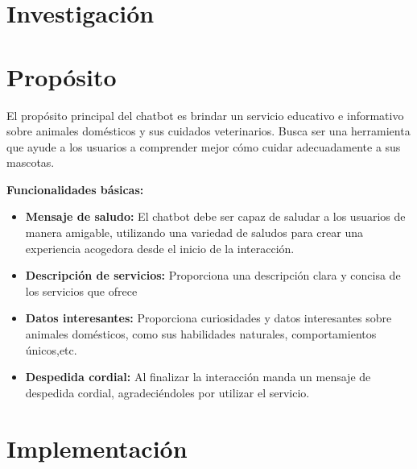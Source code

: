 \documentclass[a4paper,12pt]{article}
\begin{document}
\section*{Investigación}

\section*{Propósito}
El propósito principal del chatbot es brindar un servicio educativo e informativo sobre animales domésticos y sus cuidados veterinarios. Busca ser una herramienta que ayude a los usuarios a comprender mejor cómo cuidar adecuadamente a sus mascotas.

\textbf{Funcionalidades básicas:}
\begin{itemize}
    \item \textbf{Mensaje de saludo:} El chatbot debe ser capaz de saludar a los usuarios de manera amigable, utilizando una variedad de saludos para crear una experiencia acogedora desde el inicio de la interacción.
    
    \item \textbf{Descripción de servicios:} Proporciona una descripción clara y concisa de los servicios que ofrece 

    \item \textbf{Datos interesantes:} Proporciona curiosidades y datos interesantes sobre animales domésticos, como sus habilidades naturales, comportamientos únicos,etc.

    \item \textbf{Despedida cordial:} Al finalizar la interacción manda un mensaje de despedida cordial, agradeciéndoles por utilizar el servicio.
\end{itemize}\section*{Implementación}



\newpage %
\thispagestyle{fancyref}
\printbibliography %
\end{document}
